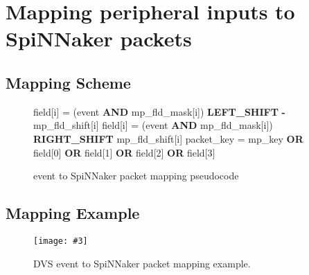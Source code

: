 \documentclass[11pt,a4paper,twoside]{article}
\newcommand{\image}[5][]
{
\begin{figure}[#2]
   \begin{center}
      \texttt{[image: \#3]}
      \caption{#5}
      \label{fig:#4}
   \end{center}
\end{figure}
}
\begin{document}
\clearpage
\section{Mapping peripheral inputs to SpiNNaker packets}


\subsection{Mapping Scheme}


\begin{figure}[!ht]
	\centering
	\begin{minipage}{0.95\columnwidth}
		\begin{algorithm}[H]
			\caption{event to SpiNNaker packet mapping pseudocode}
			\begin{algorithmic}[1]
					    \State field[i] = (event \textbf{AND} mp\_fld\_mask[i]) \textbf{LEFT\_SHIFT} \textbf{-}mp\_fld\_shift[i]
				    \Else
					    \State field[i] = (event \textbf{AND} mp\_fld\_mask[i]) \textbf{RIGHT\_SHIFT} mp\_fld\_shift[i]
					\EndIf
				\EndFor
				\State packet\_key = mp\_key \textbf{OR} field[0] \textbf{OR} field[1] \textbf{OR} field[2] \textbf{OR} field[3]
			\end{algorithmic}
			\label{alg:crd+cfc_fifo}
		\end{algorithm}
	\end{minipage}
\end{figure}


\subsection{Mapping Example}


\image[width = 0.9 \textwidth]{!h}{mapper_ex}{fig:maper_fig}
{DVS event to SpiNNaker packet mapping example.}
\end{document}
